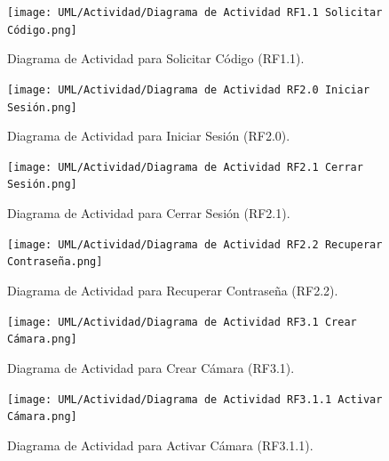 \begin{figure}[H]
    \centering
    \caption{Diagrama de Actividad para Solicitar Código (RF1.1).}
 \texttt{[image: UML/Actividad/Diagrama de Actividad RF1.1 Solicitar Código.png]}
\end{figure}


\begin{figure}[H]
	\centering
	\caption{Diagrama de Actividad para Iniciar Sesión (RF2.0).}
 \texttt{[image: UML/Actividad/Diagrama de Actividad RF2.0 Iniciar Sesión.png]}
\end{figure}


\begin{figure}[H]
	\centering
		\caption{Diagrama de Actividad para Cerrar Sesión (RF2.1).}
	\texttt{[image: UML/Actividad/Diagrama de Actividad RF2.1 Cerrar Sesión.png]}
\end{figure}


\begin{figure}[H]
	\centering
	\caption{Diagrama de Actividad para Recuperar Contraseña (RF2.2).}
 \texttt{[image: UML/Actividad/Diagrama de Actividad RF2.2 Recuperar Contraseña.png]}
\end{figure}


\begin{figure}[H]
	\centering
	\caption{Diagrama de Actividad para Crear Cámara (RF3.1).}
 \texttt{[image: UML/Actividad/Diagrama de Actividad RF3.1 Crear Cámara.png]}
\end{figure}


\begin{figure}[H]
	\centering
		\caption{Diagrama de Actividad para Activar Cámara (RF3.1.1).}
	\texttt{[image: UML/Actividad/Diagrama de Actividad RF3.1.1 Activar Cámara.png]}
\end{figure}


